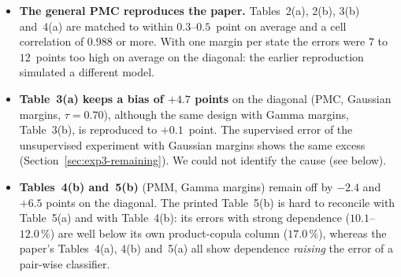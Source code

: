 \documentclass[11pt,a4paper]{article}
\begin{document}
\begin{itemize}
  \item \textbf{The general PMC reproduces the paper.} Tables~2(a), 2(b),
        3(b) and~4(a) are matched to within $0.3$--$0.5$~point on average
        and a cell correlation of $0.988$ or more. With one margin per state
        the errors were $7$ to $12$~points too high on average on the
        diagonal: the earlier reproduction simulated a different model.
  \item \textbf{Table~3(a) keeps a bias of $+4.7$ points} on the diagonal
        (PMC, Gaussian margins, $\tau=0.70$), although the same design with
        Gamma margins, Table~3(b), is reproduced to $+0.1$~point. The
        supervised error of the unsupervised experiment with Gaussian
        margins shows the same excess (Section~\ref{sec:exp3-remaining}).
        We could not identify the cause (see below).
  \item \textbf{Tables~4(b) and~5(b)} (PMM, Gamma margins) remain off by
        $-2.4$ and $+6.5$ points on the diagonal. The printed Table~5(b) is
        hard to reconcile with Table~5(a) and with Table~4(b): its errors
        with strong dependence ($10.1$--$12.0\,\%$) are well below its own
        product-copula column ($17.0\,\%$), whereas the paper's Tables~4(a),
        4(b) and~5(a) all show dependence \emph{raising} the error of a
        pair-wise classifier.
\end{itemize}
\end{document}
